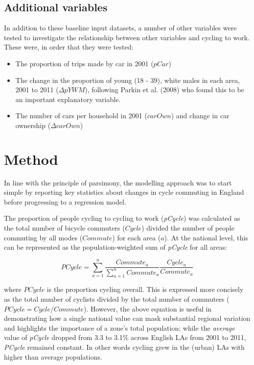 \subsection{Additional variables}\label{additional-variables}

In addition to these baseline input datasets, a number of other
variables were tested to investigate the relationship between other
variables and cycling to work. These were, in order that they were
tested:

\begin{itemize}
\itemsep1pt\parskip0pt
\item
  The proportion of trips made by car in 2001 ($pCar$)
\item
  The change in the proportion of young (18 - 39), white males in each
  area, 2001 to 2011 ($\Delta pYWM$), following Parkin et al. (2008) who
  found this to be an important explanatory variable.
\item
  The number of cars per household in 2001 ($carOwn$) and change in car
  ownership ($\Delta carOwn$)
\end{itemize}

\section{Method}\label{method}

In line with the principle of parsimony, the modelling approach was to
start simple by reporting key statistics about changes in cycle
commuting in England before progressing to a regression model.

The proportion of people cycling to cycling to work (\emph{pCycle}) was
calculated as the total number of bicycle commuters ($Cycle$) divided
the number of people commuting by all modes ($Commute$) for each area
($a$). At the national level, this can be represented as the
population-weighted sum of \emph{pCycle} for all areas:

\[PCycle = \sum_{a=1}^n \frac{Commute_a}{\sum_{a=1}^n Commute_a} \frac{Cycle_a}{Commute_a} \]

where $PCycle$ is the proportion cycling overall. This is expressed more
concisely as the total number of cyclists divided by the total number of
commuters ($PCycle = Cycle / Commute$). However, the above equation is
useful in demonstrating how a single national value can mask substantial
regional variation and highlights the importance of a zone's total
population: while the \emph{average} value of \emph{pCycle} dropped from
3.3 to 3.1\% across English LAs from 2001 to 2011, \emph{PCycle}
remained constant. In other words cycling grew in the (urban) LAs with
higher than average populations.

